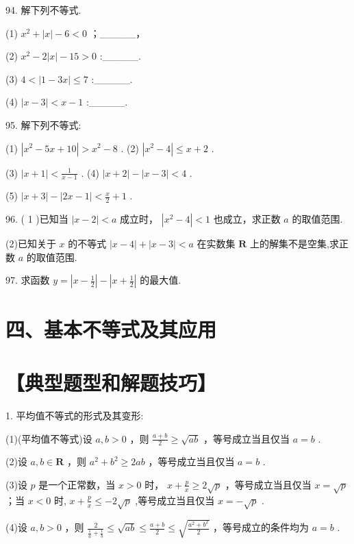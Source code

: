 \documentclass[10pt]{article}
\begin{document}
94. 解下列不等式.

(1) \({x}^{2} + \left| x\right|  - 6 < 0\) ；\_\_\_\_\_，

(2) \({x}^{2} - {2\left| x\right| } - {15} > 0\) :\_\_\_\_\_.

(3) \(4 < \left| {1 - {3x}}\right|  \leq  7\) :\_\_\_\_\_.

(4) \(\left| {x - 3}\right|  < x - 1\) :\_\_\_\_\_.

95. 解下列不等式:

(1) \(\left| {{x}^{2} - {5x} + {10}}\right|  > {x}^{2} - 8\) . (2) \(\left| {{x}^{2} - 4}\right|  \leq  x + 2\) .

(3) \(\left| {x + 1}\right|  < \frac{1}{x - 1}\) . (4) \(\left| {x + 2}\right|  - \left| {x - 3}\right|  < 4\) .

(5) \(\left| {x + 3}\right|  - \left| {{2x} - 1}\right|  < \frac{x}{2} + 1\) .

96. ( 1 )已知当 \(\left| {x - 2}\right|  < a\) 成立时， \(\left| {{x}^{2} - 4}\right|  < 1\) 也成立，求正数 \(a\) 的取值范围.

(2)已知关于 \(x\) 的不等式 \(\left| {x - 4}\right|  + \left| {x - 3}\right|  < a\) 在实数集 \(\mathbf{R}\) 上的解集不是空集,求正数 \(a\) 的取值范围.

97. 求函数 \(y = \left| {x - \frac{1}{2}}\right|  - \left| {x + \frac{1}{2}}\right|\) 的最大值.

\section*{四、基本不等式及其应用}

\section*{【典型题型和解题技巧】}

1. 平均值不等式的形式及其变形:

(1)(平均值不等式)设 \(a,b > 0\) ，则 \(\frac{a + b}{2} \geq  \sqrt{ab}\) ，等号成立当且仅当 \(a = b\) .

(2)设 \(a,b \in  \mathbf{R}\) ，则 \({a}^{2} + {b}^{2} \geq  {2ab}\) ，等号成立当且仅当 \(a = b\) .

(3)设 \(p\) 是一个正常数，当 \(x > 0\) 时， \(x + \frac{p}{x} \geq  2\sqrt{p}\) ，等号成立当且仅当 \(x = \sqrt{p}\) ；当 \(x < 0\) 时, \(x + \frac{p}{x} \leq   - 2\sqrt{p}\) ,等号成立当且仅当 \(x =  - \sqrt{p}\) .

(4)设 \(a,b > 0\) ，则 \(\frac{2}{\frac{1}{a} + \frac{1}{b}} \leq  \sqrt{ab} \leq  \frac{a + b}{2} \leq  \sqrt{\frac{{a}^{2} + {b}^{2}}{2}}\) ，等号成立的条件均为 \(a = b\) .
\end{document}
